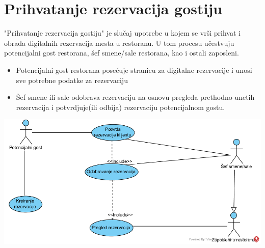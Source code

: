 \documentclass{article}
\begin{document}
\section{Prihvatanje rezervacija gostiju}
"Prihvatanje rezervacija gostiju" je slučaj upotrebe u kojem se vrši prihvat i obrada digitalnih rezervacija mesta u restoranu. U tom procesu učestvuju potencijalni gost restorana, šef smene/sale restorana, kao i ostali zaposleni.

\begin{itemize}
\item Potencijalni gost restorana posećuje stranicu za digitalne rezervacije i unosi sve potrebne podatke za rezervaciju
\item Šef smene ili sale odobrava rezervaciju na osnovu pregleda prethodno unetih rezervacija i potvrdjuje(ili odbija) rezervaciju potencijalnom gostu.
\end{itemize}
\vspace{1cm}
\includegraphics[width=\textwidth]{SU_5_prihvatanje_rezervacija.png}
\end{document}
